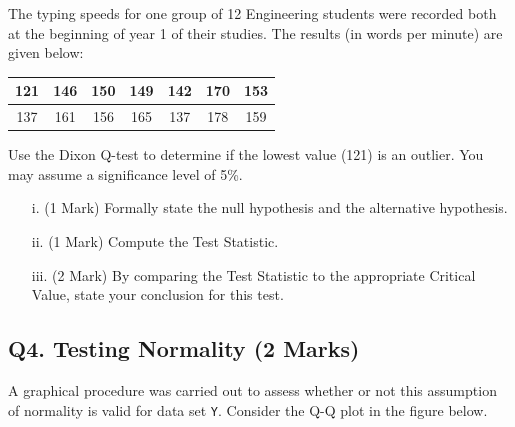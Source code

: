 \documentclass[a4paper,12pt]{article}
\begin{document}
The typing speeds for one group of 12 Engineering students were recorded both at the beginning of year 1 of their studies. The results (in words per minute) are given below:

\begin{center}
\begin{tabular}{|c|c|c|c|c|c|c|}
\hline
121 & 146 & 150 &149 &142 &170& 153\\ \hline
 137 & 161 & 156& 165& 137& 178& 159
\\ \hline
\end{tabular}
\end{center}
Use the Dixon Q-test to determine if the lowest value (121) is an outlier. You may assume a significance level of 5\%.

\begin{itemize}
\item[i.] (1 Mark) Formally state the null hypothesis and the alternative hypothesis.
\item[ii.] (1 Mark) Compute the Test Statistic.
\item[iii.] (2 Mark) By comparing the Test Statistic to the appropriate Critical Value, state your conclusion for this test.
\end{itemize}

\subsection*{Q4. Testing Normality (2 Marks)} %
A graphical procedure was carried out to assess whether or not this assumption of normality is valid for data set \texttt{Y}. Consider the Q-Q plot in the figure below.
\end{document}
